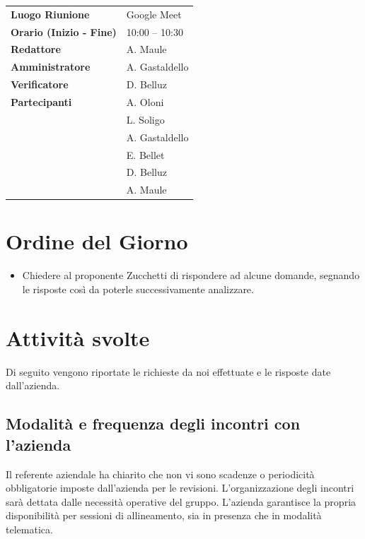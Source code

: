\documentclass[a4paper,12pt]{article}
\begin{document}
\begin{tabular}{>{\bfseries}p{5cm} | p{10cm}}
Luogo Riunione & Google Meet \\[6pt]

Orario (Inizio - Fine) & 10:00 -- 10:30 \\[6pt]

Redattore &
  A. Maule\\[6pt]

Amministratore & 
A. Gastaldello\\[6pt]

Verificatore &
D. Belluz\\[6pt]

Partecipanti &
  A. Oloni\\ &
  L. Soligo\\&
  A. Gastaldello\\&
  E. Bellet\\&
  D. Belluz\\&
  A. Maule\\[6pt]
  
\end{tabular}

\section{Ordine del Giorno}
    \begin{itemize}
    \item  Chiedere al proponente Zucchetti di rispondere ad alcune 
domande, segnando le risposte così da poterle successivamente analizzare.
    \end{itemize}

\section{Attività svolte}
Di seguito vengono riportate le richieste da noi effettuate e le risposte date dall'azienda.

\subsection{Modalità e frequenza degli incontri con l'azienda}
Il referente aziendale ha chiarito che non vi sono scadenze o periodicità obbligatorie imposte dall'azienda per le revisioni. L'organizzazione degli incontri sarà dettata dalle necessità operative del gruppo. L'azienda garantisce la propria disponibilità per sessioni di allineamento, sia in presenza che in modalità telematica.
\end{document}
